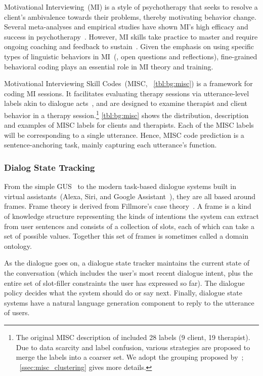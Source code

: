 Motivational Interviewing~(MI) is a style of psychotherapy that seeks
to resolve a client's ambivalence towards their problems, thereby
motivating behavior change. Several meta-analyses and empirical
studies have shown MI's high efficacy and success in
psychotherapy~\citep{burke2004emerging, martins2009review,
  lundahl2010meta}. However, MI skills take practice to master and
require ongoing coaching and feedback to sustain~\citep{Schwalbe2014}.
Given the emphasis on using specific types of linguistic behaviors in
MI~(\eg, open questions and reflections), fine-grained behavioral
coding plays an essential role in MI theory and training.

Motivational Interviewing Skill Codes~(MISC, ~\autoref{tbl:bg:misc})
is a framework for coding MI sessions. It facilitates evaluating
therapy sessions via utterance-level labels akin to dialogue
acts~\citep{stolcke2000dialogue,jurafsky2018speech}, and are designed
to examine therapist and client behavior in a therapy
session.\footnote{The original MISC description of
  \citet{miller2003manual} included 28 labels (9 client, 19
  therapist). Due to data scarcity and label confusion, various
  strategies are proposed to merge the labels into a coarser set.  We
  adopt the grouping proposed by~\citet{xiao2016behavioral};
  ~\autoref{ssec:misc_clustering} gives more details.}
\autoref{tbl:bg:misc} shows the distribution, description and examples
of MISC labels for clients and therapists. Each of the MISC labels
will be corresponding to a single utterance. Hence, MISC code
prediction is a sentence-anchoring task, mainly capturing each
utterance's function.

\subsubsection{Dialog State Tracking}
\label{ssec:bg:dialogue-state}
From the simple GUS~\citep{bobrow1977gus} to the modern task-based
dialogue systems built in virtual assistants~(Alexa, Siri, and Google
Assistant~\etal), they are all based around frames. Frame theory is
derived from Fillmore's case theory~\citep{Fillmore:68}. A frame is a
kind of knowledge structure representing the kinds of intentions the
system can extract from user sentences and consists of a collection of
slots, each of which can take a set of possible values. Together this
set of frames is sometimes called a domain ontology.

As the dialogue goes on, a dialogue state tracker maintains the
current state of the conversation (which includes the user's most recent
dialogue intent, plus the entire set of slot-filler constraints the
user has expressed so far). The dialogue policy decides what the
system should do or say next. Finally, dialogue state systems have a
natural language generation component to reply to the utterance of users.

